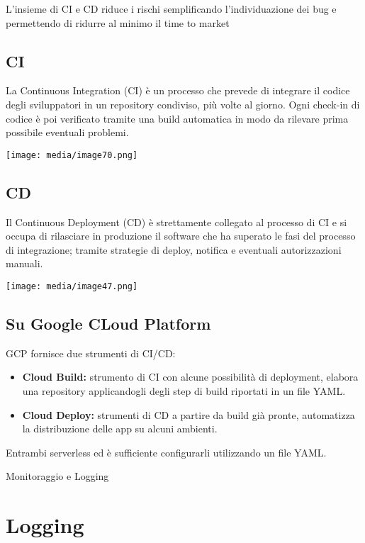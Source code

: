 L'insieme di CI e CD riduce i rischi semplificando l'individuazione dei
bug e permettendo di ridurre al minimo il time to market

\subsection{CI}\label{ci}

La Continuous Integration (CI) è un processo che prevede di integrare il
codice degli sviluppatori in un repository condiviso, più volte al
giorno. Ogni check-in di codice è poi verificato tramite una build
automatica in modo da rilevare prima possibile eventuali problemi.

\texttt{[image: media/image70.png]}

\subsection{CD}\label{cd}

Il Continuous Deployment (CD) è strettamente collegato al processo di CI
e si occupa di rilasciare in produzione il software che ha superato le
fasi del processo di integrazione; tramite strategie di deploy, notifica
e eventuali autorizzazioni manuali.

\texttt{[image: media/image47.png]}

\subsection{Su Google CLoud Platform}\label{su-google-cloud-platform}

GCP fornisce due strumenti di CI/CD:

\begin{itemize}
\item
  \textbf{Cloud Build:} strumento di CI con alcune possibilità di
  deployment, elabora una repository applicandogli degli step di build
  riportati in un file YAML.
\item
  \textbf{Cloud Deploy:} strumenti di CD a partire da build già pronte,
  automatizza la distribuzione delle app su alcuni ambienti.
\end{itemize}

Entrambi serverless ed è sufficiente configurarli utilizzando un file
YAML.

Monitoraggio e Logging

\section{Logging}\label{logging}

